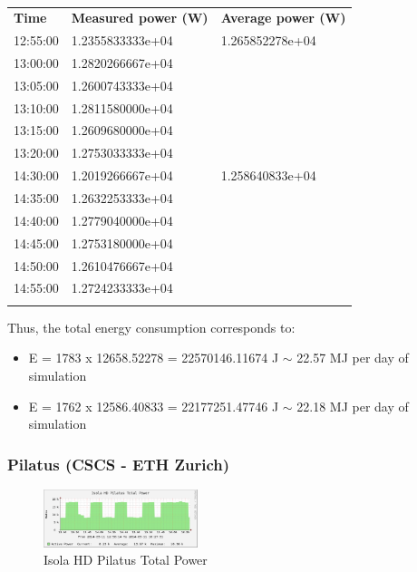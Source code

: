\begin{table}
  \begin{center}
    \caption{}
    \label{tab:2}
    \begin{tabular}{lll}
      \hline\noalign{\smallskip}
      \textbf{Time} & \textbf{Measured power (W)} & \textbf{Average power (W)} \\
      \noalign{\smallskip}\hline\noalign{\smallskip}
      12:55:00 & 1.2355833333e+04 & 1.265852278e+04 \\ 
      13:00:00 & 1.2820266667e+04 &  \\
      13:05:00 & 1.2600743333e+04 &  \\ 
      13:10:00 & 1.2811580000e+04 &  \\
      13:15:00 & 1.2609680000e+04 &  \\
      13:20:00 & 1.2753033333e+04 &  \\
      \noalign{\smallskip}\hline\noalign{\smallskip}
      14:30:00 & 1.2019266667e+04 & 1.258640833e+04 \\ 
      14:35:00 & 1.2632253333e+04 &  \\
      14:40:00 & 1.2779040000e+04 &  \\
      14:45:00 & 1.2753180000e+04 &  \\
      14:50:00 & 1.2610476667e+04 &  \\
      14:55:00 & 1.2724233333e+04 &  \\
      \noalign{\smallskip}\hline
    \end{tabular}
  \end{center}
\end{table}

Thus, the total energy consumption corresponds to: 
\begin{itemize}
\item E  = 1783 x 12658.52278  = 22570146.11674 J $\sim$  22.57 MJ per
  day of simulation
\item E  = 1762 x 12586.40833  = 22177251.47746 J $\sim$  22.18 MJ per
  day of simulation
\end{itemize}

\subsubsection{Pilatus (CSCS - ETH Zurich)}
\begin{figure}[htbf]
  \includegraphics[width=0.4\textwidth]{Figs/NRJ_benchmark_Pilatus.eps}
  \caption{Isola HD Pilatus Total Power}
  \label{fig:2}
\end{figure}

